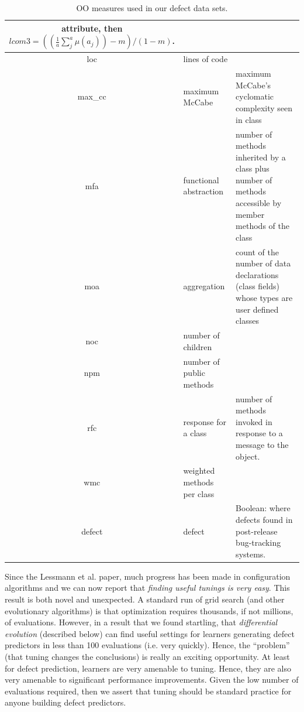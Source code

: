 \documentclass[smallextended]{svjour3}
\begin{document}
\begin{table}[t]
\begin{center}
{\begin{tabular}{c|l|p{}}
attribute, 
then
$lcom3=((\frac{1}{a} \sum_j^a \mu(a_j)) - m)/ (1-m)$.
\\\hline
loc & lines of code &\\\hline
max\_cc & maximum McCabe & maximum McCabe's cyclomatic complexity seen
in class\\\hline
mfa & functional abstraction & number of methods inherited by a class
plus number of methods accessible by member methods of the
class\\\hline
moa &  aggregation &  count of the number of data declarations (class
fields) whose types are user defined classes\\\hline
noc &  number of children &\\\hline
npm & number of public methods & \\\hline
rfc & response for a class &number of  methods invoked in response to
a message to the object.\\\hline
wmc & weighted methods per class &\\\hline
\rowcolor{lightgray}
defect & defect & Boolean: where defects found in post-release bug-tracking systems.
\end{tabular}
}
\end{center}
\caption{OO measures used in our defect data sets.}\label{tab:ck}
\end{table}



Since the Lessmann et al. paper, much progress has been made in 
configuration algorithms
and we can now report that  {\em finding useful tunings is very easy}.
This result is both novel and unexpected.
A standard run of grid search (and other  evolutionary algorithms)
is  that optimization requires   thousands,
if not millions, of evaluations.  However, in a result that we found startling, that  {\em differential evolution} (described below) can find useful settings for learners generating defect predictors
in less than 100 evaluations (i.e. very quickly).
Hence,   the ``problem'' (that
tuning changes the conclusions) is really
an exciting opportunity. At least for defect prediction,
 learners are very   amenable to tuning. Hence, 
 they are  also very
amenable to significant performance improvements. Given the low
number of evaluations required, then we assert that tuning
  should be standard practice
for anyone building defect predictors.

\end{document}
